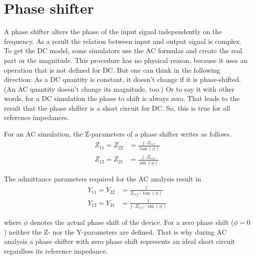 \section{Phase shifter}

A phase shifter alters the phase of the input signal independently on
the frequency.  As a result the relation between input and output
signal is complex.  To get the DC model, some simulators use the AC
formulas and create the real part or the magnitude.  This procedure
has no physical reason, because it uses an operation that is not
defined for DC.  But one can think in the following direction: As a DC
quantity is constant, it doesn't change if it is phase-shifted.  (An
AC quantity doesn't change its magnitude, too.)  Or to say it with
other words, for a DC simulation the phase to shift is always zero.
That leads to the result that the phase shifter is a short circuit for
DC.  So, this is true for all reference impedances.

\addvspace{12pt}

For an AC simulation, the Z-parameters of a phase shifter writes
as follows.
\begin{align}
Z_{11} = Z_{22} &= \frac{j\cdot Z_{ref}}{\tan(\phi)}\\
Z_{12} = Z_{21} &= \frac{j\cdot Z_{ref}}{\sin(\phi)}
\end{align}

The admittance parameters required for the AC analysis result in
\begin{align}
Y_{11} = Y_{22} &= \frac{j}{Z_{ref} \cdot \tan{\left(\phi\right)}}\\
Y_{12} = Y_{21} &= \frac{1}{j\cdot Z_{ref}\cdot \sin{\left(\phi\right)}}
\end{align}

where $\phi$ denotes the actual phase shift of the device.  For a zero
phase shift ($\phi = 0$) neither the Z- nor the Y-parameters are
defined.  That is why during AC analysis a phase shifter with zero
phase shift represents an ideal short circuit regardless its reference
impedance.

\addvspace{12pt}


